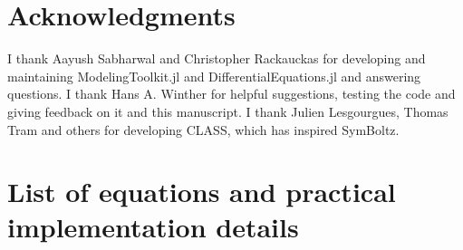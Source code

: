 \documentclass{aa}
\newcommand{\LCDM}{$\mathrm{\Lambda C D M}$}
\newcommand\TODO[1]{\textcolor{red}{(\textbf{TODO:} #1)}}
\begin{document}

\section*{Acknowledgments}

I thank Aayush Sabharwal and Christopher Rackauckas for developing and maintaining ModelingToolkit.jl and DifferentialEquations.jl and answering questions.
I thank Hans A. Winther for helpful suggestions, testing the code and giving feedback on it and this manuscript.
I thank Julien Lesgourgues, Thomas Tram and others for developing CLASS, which has inspired SymBoltz.




\appendix
\onecolumn

\section{List of equations and practical implementation details}
\label{sec:implementation}
\end{document}
